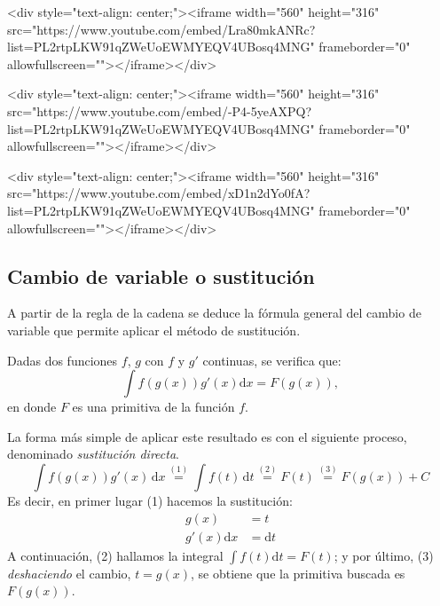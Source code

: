 \begin{rawhtml}
<div style="text-align: center;"><iframe width="560" height="316" src="https://www.youtube.com/embed/Lra80mkANRc?list=PL2rtpLKW91qZWeUoEWMYEQV4UBosq4MNG" frameborder="0" allowfullscreen=""></iframe></div>
\end{rawhtml}

\begin{rawhtml}
<div style="text-align: center;"><iframe width="560" height="316" src="https://www.youtube.com/embed/-P4-5yeAXPQ?list=PL2rtpLKW91qZWeUoEWMYEQV4UBosq4MNG" frameborder="0" allowfullscreen=""></iframe></div>
\end{rawhtml}

\begin{rawhtml}
<div style="text-align: center;"><iframe width="560" height="316" src="https://www.youtube.com/embed/xD1n2dYo0fA?list=PL2rtpLKW91qZWeUoEWMYEQV4UBosq4MNG" frameborder="0" allowfullscreen=""></iframe></div>
\end{rawhtml}

\subsection{Cambio de variable o sustitución}

A partir de la regla de la cadena se deduce la fórmula general del cambio de variable que permite aplicar el método de sustitución.
%
\begin{teorema}\label{th:sustitucion}
Dadas dos funciones $f$, $g$ con $f$ y $g'$ continuas, se verifica que:
$$
\displaystyle\int f(g(x))g'(x)\mathrm dx = F(g(x)),
$$
en donde $F$ es una primitiva de la función $f$. 
\end{teorema}

La forma más simple de aplicar este resultado es con el siguiente proceso, denominado \emph{sustitución directa}.
\[
\displaystyle\int f(g(x))g'(x)\,\mathrm dx
\stackrel{(1)}{=} \displaystyle\int f(t)\,\mathrm dt
\stackrel{(2)}{=} F(t)
\stackrel{(3)}{=} F(g(x))+C
\]
Es decir, en primer lugar (1) hacemos la sustitución:
\begin{align*}
g(x) &= t\\
g'(x)\mathrm dx &= \mathrm dt
\end{align*}
A continuación, (2) hallamos la integral $\displaystyle\int f(t)\mathrm dt = F(t)$; y por último,
(3) \emph{deshaciendo} el cambio, $t = g(x)$, se obtiene que la
primitiva buscada es $F(g(x))$. 

